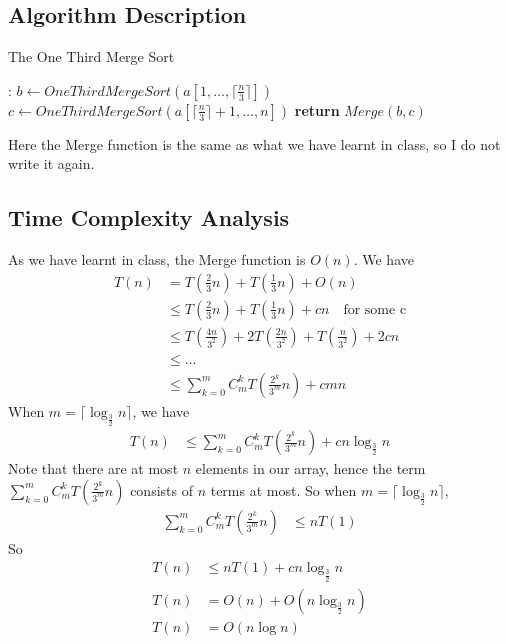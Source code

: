 \documentclass[12pt,letterpaper]{article}
\begin{document}
\subsection{Algorithm Description}
\begin{algorithm}
    \caption{The One Third Merge Sort}\label{alg:13merge}
    \begin{algorithmic}[1]
    :
    \EndIf
    \State $b\gets OneThirdMergeSort(a[1,\dots,\lceil\frac{n}{3}\rceil])$
    \State $c\gets OneThirdMergeSort(a[\lceil\frac{n}{3}\rceil+1,\dots,n])$
    \State \textbf{return} $Merge(b,c)$
    \EndProcedure
    \end{algorithmic}
\end{algorithm}
Here the Merge function is the same as what we have learnt in class, so I do not write it again.
\subsection{Time Complexity Analysis}
As we have learnt in class, the Merge function is $O(n)$. We have
\begin{align}
    T(n)&=T(\frac{2}{3}n)+T(\frac{1}{3}n)+O(n)\\
    &\leq T(\frac{2}{3}n)+T(\frac{1}{3}n)+cn\quad \text{for some c}\\
    &\leq T(\frac{4n}{3^2})+2T(\frac{2n}{3^2})+T(\frac{n}{3^2})+2cn\\
    &\leq\dots\\
    &\leq \sum_{k=0}^m C_{m}^{k}T(\frac{2^k}{3^m}n)+cmn
\end{align}
When $m=\lceil\log_{\frac{3}{2}}n\rceil$, we have 
\begin{align}
    T(n)&\leq \sum_{k=0}^m C_{m}^{k}T(\frac{2^k}{3^m}n)+cn\log_{\frac{3}{2}}n
\end{align} 
Note that there are at most $n$ elements in our array, hence the term $\sum_{k=0}^m C_{m}^{k}T(\frac{2^k}{3^m}n)$ consists of $n$ terms at most. So when $m=\lceil\log_{\frac{3}{2}}n\rceil$,
\begin{align}
    \sum_{k=0}^m C_{m}^{k}T(\frac{2^k}{3^m}n)&\leq nT(1)
\end{align}  
So
\begin{align}
    T(n)&\leq nT(1)+cn\log_{\frac{3}{2}}n \\
    T(n)&=O(n)+O(n\log_{\frac{3}{2}}n)\\
    T(n)&=O(n\log n)
\end{align}
\end{document}
